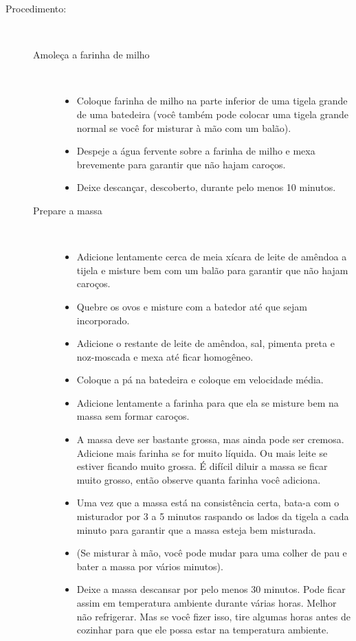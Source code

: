 \documentclass [11pt, letterpaper] {article}
\begin{document}
\begin {description}
\item [Procedimento:] \ \\
\begin {description}
\item [Amole\c{c}a a farinha de milho] \ \\
\begin {itemize}
\item Coloque farinha de milho na parte inferior de uma tigela grande de uma batedeira (você também pode colocar uma tigela grande normal se você for misturar à mão com um balão).
\item Despeje a água fervente sobre a farinha de milho e mexa brevemente para garantir que não hajam caro\c{c}os.
\item Deixe descan\c{c}ar, descoberto, durante pelo menos 10 minutos.
\end {itemize}
\item [Prepare a massa] \ \\
\begin {itemize}
\item Adicione lentamente cerca de meia xícara de leite de amêndoa a tijela e misture bem com um balão para garantir que não hajam caro\c{c}os.
\item Quebre os ovos e misture com a batedor até que sejam incorporado.
\item Adicione o restante de leite de amêndoa, sal, pimenta preta e noz-moscada e mexa até ficar homogêneo.
\item Coloque a p\'a na batedeira e coloque em velocidade média.
\item Adicione lentamente a farinha para que ela se misture bem na massa sem formar caro\c{c}os.
\item A massa deve ser bastante grossa, mas ainda pode ser cremosa. Adicione mais farinha se for muito l\'iquida. Ou mais leite se estiver ficando muito grossa. É difícil diluir a massa se ficar muito grosso, então observe quanta farinha você adiciona.
\item Uma vez que a massa está na consistência certa, bata-a com o misturador por 3 a 5 minutos raspando os lados da tigela a cada minuto para garantir que a massa esteja bem misturada.
\item (Se misturar à mão, você pode mudar para uma colher de pau e bater a massa por vários minutos).
\item Deixe a massa descansar por pelo menos 30 minutos. Pode ficar assim em temperatura ambiente durante várias horas. Melhor não refrigerar. Mas se você fizer isso, tire algumas horas antes de cozinhar para que ele possa estar na temperatura ambiente.
\end {itemize}



\end{description}
\end{description}
\end{document}
